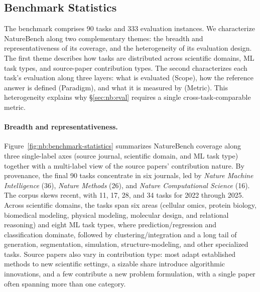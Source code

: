 \documentclass{llmxive}
\begin{document}
\subsection{Benchmark Statistics}
\label{sec:nb:stats}


The benchmark comprises 90 tasks and 333 evaluation instances. We characterize NatureBench along two complementary themes: the breadth and representativeness of its coverage, and the heterogeneity of its evaluation design. The first theme describes how tasks are distributed across scientific domains, ML task types, and source-paper contribution types. The second characterizes each task's evaluation along three layers: what is evaluated (Scope), how the reference answer is defined (Paradigm), and what it is measured by (Metric). This heterogeneity explains why \S\ref{sec:nb:eval} requires a single cross-task-comparable metric.

\paragraph{Breadth and representativeness.}
Figure~\ref{fig:nb:benchmark-statistics} summarizes NatureBench coverage along three single-label axes (source journal, scientific domain, and ML task type) together with a multi-label view of the source papers' contribution nature.
By provenance, the final 90 tasks concentrate in six journals, led by \emph{Nature Machine Intelligence} (36), \emph{Nature Methods} (26), and \emph{Nature Computational Science} (16). The corpus skews recent, with 11, 17, 28, and 34 tasks for 2022 through 2025.
Across scientific domains, the tasks span six areas (cellular omics, protein biology, biomedical modeling, physical modeling, molecular design, and relational reasoning) and eight ML task types, where prediction/regression and classification dominate, followed by clustering/integration and a long tail of generation, segmentation, simulation, structure-modeling, and other specialized tasks.
Source papers also vary in contribution type: most adapt established methods to new scientific settings, a sizable share introduce algorithmic innovations, and a few contribute a new problem formulation, with a single paper often spanning more than one category.
\end{document}
